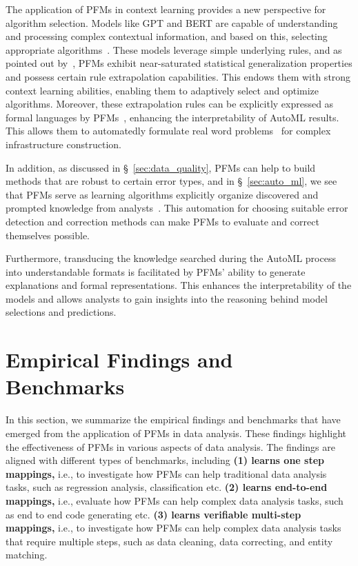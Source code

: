   The application of PFMs in context learning provides a new perspective for algorithm selection. Models like GPT and BERT are capable of understanding and processing complex contextual information, and based on this, selecting appropriate algorithms~\cite{009brown2020language, EoTGE}. These models leverage simple underlying rules, and as pointed out by~\cite{reizingerposition}, PFMs exhibit near-saturated statistical generalization properties and possess certain rule extrapolation capabilities. This endows them with strong context learning abilities, enabling them to adaptively select and optimize algorithms. Moreover, these extrapolation rules can be explicitly expressed as formal languages by PFMs~\cite{cheng2022binding}, enhancing the interpretability of AutoML results. This allows them to automatedly formulate real word problems~\cite{JiangSQLZZY25} for complex infrastructure construction.

  In addition, as discussed in \S~\ref{sec:data_quality}, PFMs can help to build methods that are robust to certain error types, and in \S~\ref{sec:auto_ml}, we see that PFMs serve as learning algorithms explicitly organize discovered and prompted knowledge from analysts~\cite{ACSV,ZeroED,YanWWML24,huh2023pool}. This automation for choosing suitable error detection and correction methods can make PFMs to evaluate and correct themselves possible.
  
  Furthermore, transducing the knowledge searched during the AutoML process into understandable formats is facilitated by PFMs' ability to generate explanations and formal representations. This enhances the interpretability of the models and allows analysts to gain insights into the reasoning behind model selections and predictions.
  
\section{Empirical Findings and Benchmarks}

In this section, we summarize the empirical findings and benchmarks that have emerged from the application of PFMs in data analysis. These findings highlight the effectiveness of PFMs in various aspects of data analysis. The findings are aligned with different types of benchmarks, including \textbf{(1) learns one step mappings,} i.e., to investigate how PFMs can help traditional data analysis tasks, such as regression analysis, classification etc. \textbf{(2) learns end-to-end mappings,} i.e., evaluate how PFMs can help complex data analysis tasks, such as end to end code generating etc. \textbf{(3) learns verifiable multi-step mappings,} i.e., to investigate how PFMs can help complex data analysis tasks that require multiple steps, such as data cleaning, data correcting, and entity matching.

